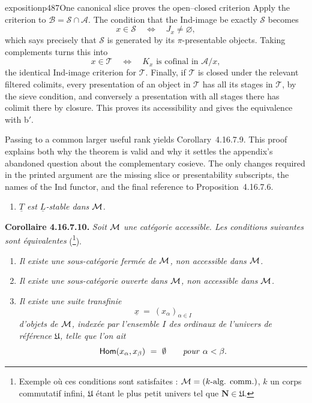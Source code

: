 \begin{dcomment}{exposition}{p487}{One canonical slice proves the open--closed criterion}
Apply the criterion to $\mathcal B=\mathcal S\cap\mathcal A$. The condition that the Ind-image be exactly $\mathcal S$ becomes
\[
 x\in\mathcal S
 \quad\Longleftrightarrow\quad
 J_x\ne\varnothing,
\]
which says precisely that $\mathcal S$ is generated by its $\pi$-presentable objects. Taking complements turns this into
\[
 x\in\mathcal T
 \quad\Longleftrightarrow\quad
 K_x\text{ is cofinal in }\mathcal A/x,
\]
the identical Ind-image criterion for $\mathcal T$. Finally, if $\mathcal T$ is closed under the relevant filtered colimits, every presentation of an object in $\mathcal T$ has all its stages in $\mathcal T$, by the sieve condition, and conversely a presentation with all stages there has colimit there by closure. This proves its accessibility and gives the equivalence with b$'$.

Passing to a common larger useful rank yields Corollary~4.16.7.9. This proof explains both why the theorem is valid and why it settles the appendix's abandoned question about the complementary cosieve. The only changes required in the printed argument are the missing slice or presentability subscripts, the names of the Ind functor, and the final reference to Proposition~4.16.7.6.
\end{dcomment}



\begin{enumerate}
\item[\textit{b$'$)}] \textit{$\underline{T}$ est $\underline{L}$-stable dans $\mathcal{M}$.}
\end{enumerate}

\noindent\textbf{Corollaire 4.16.7.10.} \textit{Soit $\mathcal{M}$ une catégorie accessible. Les conditions suivantes sont équivalentes} (\footnote[202]{Exemple où ces conditions sont satisfaites : $\mathcal{M} = (k\text{-alg. comm.})$, $k$ un corps commutatif infini, $\mathfrak{U}$ étant le plus petit univers tel que $\mathbf{N}\in\mathfrak{U}$.}).
\begin{enumerate}
\item[\textit{a)}] \textit{Il existe une sous-catégorie fermée de $\mathcal{M}$, non accessible dans $\mathcal{M}$.}
\item[\textit{b)}] \textit{Il existe une sous-catégorie ouverte dans $\mathcal{M}$, non accessible dans $\mathcal{M}$.}
\item[\textit{c)}] \textit{Il existe une suite transfinie}
\[
\underline{x} \ = \ (x_\alpha)_{\alpha\in I}
\]
\textit{d'objets de $\mathcal{M}$, indexée par l'ensemble $I$ des ordinaux de l'univers de référence $\mathfrak{U}$, telle que l'on ait}
\[
\mathsf{Hom}(x_\alpha,x_\beta) \ = \ \emptyset \qquad \text{\textit{pour} } \alpha<\beta .
\]
\end{enumerate}

